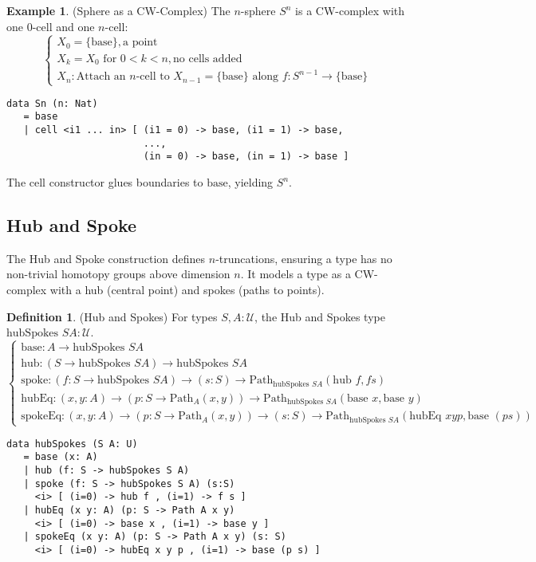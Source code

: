\documentclass{article}
\theoremstyle{definition}
\newtheorem{definition}{Definition}
\newtheorem{example}{Example}
\begin{document}
\begin{example} (Sphere as a CW-Complex)
The $n$-sphere $S^n$ is a CW-complex with one 0-cell and one $n$-cell:
\[
\begin{cases}
X_0 = \{ \text{base} \}, \text{a point} \\
X_k = X_0 \text{ for } 0 < k < n, \text{no cells added} \\
X_n: \text{Attach an } n\text{-cell to } X_{n-1} = \{ \text{base} \} \text{ along } f : S^{n-1} \to \{ \text{base} \}
\end{cases}
\]
\begin{lstlisting}
data Sn (n: Nat)
   = base
   | cell <i1 ... in> [ (i1 = 0) -> base, (i1 = 1) -> base,
                        ...,
                        (in = 0) -> base, (in = 1) -> base ]
\end{lstlisting}
The $\text{cell}$ constructor glues boundaries to $\text{base}$, yielding $S^n$.
\end{example}

\newpage
\subsection{Hub and Spoke}
The Hub and Spoke construction defines $n$-truncations, ensuring a type has no non-trivial homotopy groups above dimension $n$. It models a type as a CW-complex with a hub (central point) and spokes (paths to points).

\begin{definition} (Hub and Spokes)
For types $S, A : \mathcal{U}$, the Hub and Spokes type $\text{hubSpokes } S A : \mathcal{U}$.
\[
\begin{cases}
\text{base} : A \to \text{hubSpokes } S A \\
\text{hub} : (S \to \text{hubSpokes } S A) \to \text{hubSpokes } S A \\
\text{spoke} : (f : S \to \text{hubSpokes } S A) \to (s : S) \to \text{Path}_{\text{hubSpokes } S A} (\text{hub } f, f s) \\
\text{hubEq} : (x, y : A) \to (p : S \to \text{Path}_A(x, y)) \to \text{Path}_{\text{hubSpokes } S A} (\text{base } x, \text{base } y) \\
\text{spokeEq} : (x, y : A) \to (p : S \to \text{Path}_A(x, y)) \to (s : S) \to \text{Path}_{\text{hubSpokes } S A} (\text{hubEq } x y p, \text{base } (p s))
\end{cases}
\]
\begin{lstlisting}
data hubSpokes (S A: U)
   = base (x: A)
   | hub (f: S -> hubSpokes S A)
   | spoke (f: S -> hubSpokes S A) (s:S)
     <i> [ (i=0) -> hub f , (i=1) -> f s ]
   | hubEq (x y: A) (p: S -> Path A x y)
     <i> [ (i=0) -> base x , (i=1) -> base y ]
   | spokeEq (x y: A) (p: S -> Path A x y) (s: S)
     <i> [ (i=0) -> hubEq x y p , (i=1) -> base (p s) ]
\end{lstlisting}
\end{definition}
\end{document}
